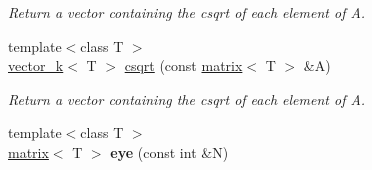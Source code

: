 \begin{DoxyCompactItemize}
\begin{DoxyCompactList}\small\item\em Return a vector containing the csqrt of each element of A. \end{DoxyCompactList}\item 
\hypertarget{namespacekeycpp_a6bc00b1e07523727e7ae0e20ec1cf834}{{\footnotesize template$<$class T $>$ }\\\hyperlink{classkeycpp_1_1vector__k}{vector\-\_\-k}$<$ T $>$ \hyperlink{namespacekeycpp_a6bc00b1e07523727e7ae0e20ec1cf834}{csqrt} (const \hyperlink{classkeycpp_1_1matrix}{matrix}$<$ T $>$ \&A)}\label{namespacekeycpp_a6bc00b1e07523727e7ae0e20ec1cf834}

\begin{DoxyCompactList}\small\item\em Return a vector containing the csqrt of each element of A. \end{DoxyCompactList}\item 
\hypertarget{namespacekeycpp_a8ae33fb19a521ab1ec1f22e7c39ca076}{{\footnotesize template$<$class T $>$ }\\\hyperlink{classkeycpp_1_1matrix}{matrix}$<$ T $>$ {\bfseries eye} (const int \&N)}\label{namespacekeycpp_a8ae33fb19a521ab1ec1f22e7c39ca076}


\end{DoxyCompactItemize}
